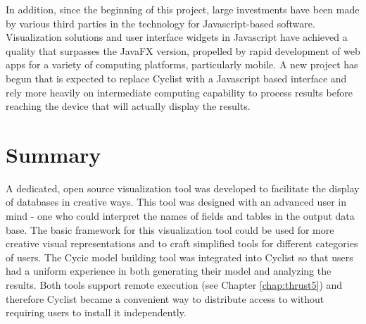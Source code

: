 In addition, since the beginning of this project, large investments have been
made by various third parties in the technology for Javascript-based software.
Visualization solutions and user interface widgets in Javascript have achieved
a quality that surpasses the JavaFX version, propelled by rapid development of
web apps for a variety of computing platforms, particularly mobile.  A new
project has begun that is expected to replace Cyclist with a Javascript based
interface and rely more heavily on intermediate computing capability to
process results before reaching the device that will actually display the
results.

\section{Summary}

A dedicated, open source visualization tool was developed to facilitate the
display of \Cyclus databases in creative ways.  This tool was designed with an
advanced user in mind - one who could interpret the names of fields and tables
in the output data base.  The basic framework for this visualization tool
could be used for more creative visual representations and to craft simplified
tools for different categories of users.  The Cycic model building tool was
integrated into Cyclist so that users had a uniform experience in both
generating their model and analyzing the results.  Both tools support remote
execution (see Chapter \ref{chap:thrust5}) and therefore Cyclist became a
convenient way to distribute access to \Cyclus without requiring users to
install it independently.

